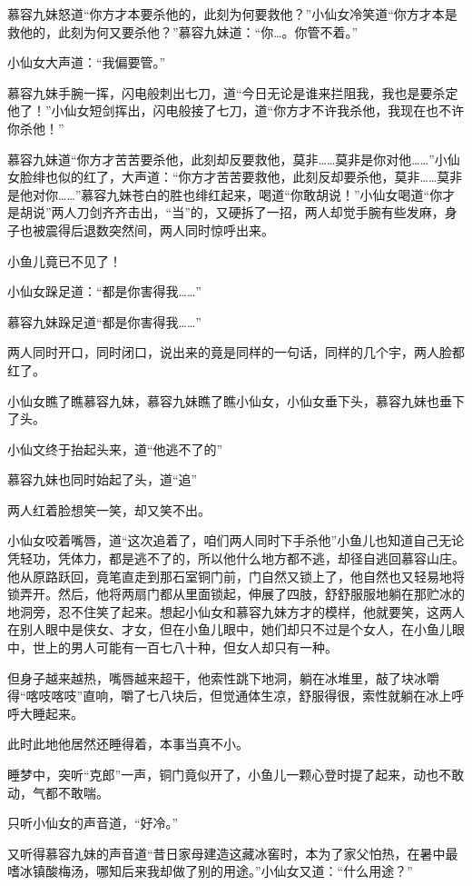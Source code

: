 \documentclass[12pt,oneside]{book}
\begin{document}
慕容九妹怒道``你方才本要杀他的，此刻为何要救他？''小仙女冷笑道``你方才本是救他的，此刻为何又要杀他？''慕容九妹道：``你\ldots。你管不着。''

小仙女大声道：``我偏要管。''

慕容九妹手腕一挥，闪电般刺出七刀，道``今日无论是谁来拦阻我，我也是要杀定他了！''小仙女短剑挥出，闪电般接了七刀，道``你方才不许我杀他，我现在也不许你杀他！''

慕容九妹道``你方才苦苦要杀他，此刻却反要救他，莫非\ldots\ldots 莫非是你对他\ldots\ldots{}''小仙女脸绯也似的红了，大声道：``你方才苦苦要救他，此刻反却要杀他，莫非\ldots\ldots 莫非是他对你\ldots\ldots{}''慕容九妹苍白的胜也绯红起来，喝道``你敢胡说！''小仙女喝道``你才是胡说''两人刀剑齐齐击出，``当''的，又硬拆了一招，两人却觉手腕有些发麻，身子也被震得后退数突然间，两人同时惊呼出来。

小鱼儿竟已不见了！

小仙女跺足道：``都是你害得我\ldots\ldots{}''

慕容九妹跺足道``都是你害得我\ldots\ldots{}''

两人同时开口，同时闭口，说出来的竟是同样的一句话，同样的几个宇，两人脸都红了。

小仙女瞧了瞧慕容九妹，慕容九妹瞧了瞧小仙女，小仙女垂下头，慕容九妹也垂下了头。

小仙文终于抬起头来，道``他逃不了的''

慕容九妹也同时始起了头，道``追''

两人红着脸想笑一笑，却又笑不出。

小仙女咬着嘴唇，道``这次追着了，咱们两人同时下手杀他''小鱼儿也知道自己无论凭轻功，凭体力，都是逃不了的，所以他什么地方都不逃，却径自逃回慕容山庄。他从原路跃回，竟笔直走到那石室铜门前，门自然又锁上了，他自然也又轻易地将锁弄开。然后，他将两扇门都从里面锁起，伸展了四肢，舒舒服服地躺在那贮冰的地洞旁，忍不住笑了起来。想起小仙女和慕容九妹方才的模样，他就要笑，这两人在别人眼中是侠女、才女，但在小鱼儿眼中，她们却只不过是个女人，在小鱼儿眼中，世上的男人可能有一百七八十种，但女人却只有一种。

但身子越来越热，嘴唇越来超干，他索性跳下地洞，躺在冰堆里，敲了块冰嚼得``喀吱喀吱''直响，嚼了七八块后，但觉通体生凉，舒服得很，索性就躺在冰上呼呼大睡起来。

此时此地他居然还睡得着，本事当真不小。

睡梦中，突听``克郎''一声，铜门竟似开了，小鱼儿一颗心登时提了起来，动也不敢动，气都不敢喘。

只听小仙女的声音道，``好冷。''

又听得慕容九妹的声音道``昔日家母建造这藏冰窖时，本为了家父怕热，在暑中最嗜冰镇酸梅汤，哪知后来我却做了别的用途。''小仙女又道：``什么用途？''
\end{document}
